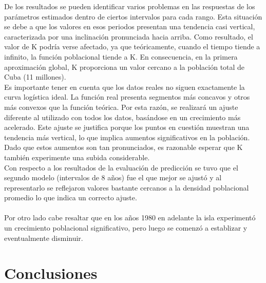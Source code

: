 \documentclass[a4paper,10pt,twocolumn]{article}
\begin{document}
De los resultados se pueden identificar varios problemas en las respuestas de los parámetros estimados dentro de ciertos intervalos para cada rango. Esta situación se debe a que los valores en esos periodos presentan una tendencia casi vertical, caracterizada por una inclinación pronunciada hacia arriba. Como resultado, el valor de K podría verse afectado, ya que teóricamente, cuando el tiempo tiende a infinito, la función poblacional tiende a K. En consecuencia, en la primera aproximación global, K proporciona un valor cercano a la población total de Cuba (11 millones).\\

Es importante tener en cuenta que los datos reales no siguen exactamente la curva logística ideal. La función real presenta segmentos más concavos y otros más convexos que la función teórica. Por esta razón, se realizará un ajuste diferente al utilizado con todos los datos, basándose en un crecimiento más acelerado. Este ajuste se justifica porque los puntos en cuestión muestran una tendencia más vertical, lo que implica aumentos significativos en la población. Dado que estos aumentos son tan pronunciados, es razonable esperar que K también experimente una subida considerable.\\
Con respecto a los resultados de la evaluación de predicción se tuvo que el segundo modelo (intervalos de 8 años) fue el que mejor se ajustó y al representarlo se reflejaron valores bastante cercanos a la densidad poblacional promedio lo que indica un correcto ajuste.\\ \\

Por otro lado cabe resaltar que en los años 1980 en adelante la isla experimentó un crecimiento poblacional significativo, pero luego se comenzó a establizar y eventualmente disminuir.




\section{Conclusiones}\label{sec:conc}
\end{document}
